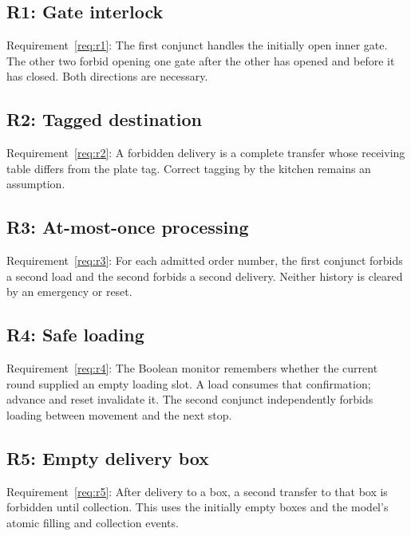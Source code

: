 \documentclass[11pt,a4paper]{article}
\newcommand{\checkedinputs}{../properties}
\begin{document}
\Needspace{350pt}
\subsection{R1: Gate interlock}
\label{formula:r1}
Requirement~\ref{req:r1}: The first conjunct handles the initially open inner gate. The other two forbid opening one gate after the other has opened and before it has closed. Both directions are necessary.


\Needspace{230pt}
\subsection{R2: Tagged destination}
\label{formula:r2}
Requirement~\ref{req:r2}: A forbidden delivery is a complete transfer whose receiving table differs from the plate tag. Correct tagging by the kitchen remains an assumption.


\Needspace{330pt}
\subsection{R3: At-most-once processing}
\label{formula:r3}
Requirement~\ref{req:r3}: For each admitted order number, the first conjunct forbids a second load and the second forbids a second delivery. Neither history is cleared by an emergency or reset.


\Needspace{530pt}
\subsection{R4: Safe loading}
\label{formula:r4}
Requirement~\ref{req:r4}: The Boolean monitor remembers whether the current round supplied an empty loading slot. A load consumes that confirmation; advance and reset invalidate it. The second conjunct independently forbids loading between movement and the next stop.


\Needspace{240pt}
\subsection{R5: Empty delivery box}
\label{formula:r5}
Requirement~\ref{req:r5}: After delivery to a box, a second transfer to that box is forbidden until collection. This uses the initially empty boxes and the model's atomic filling and collection events.

\end{document}
